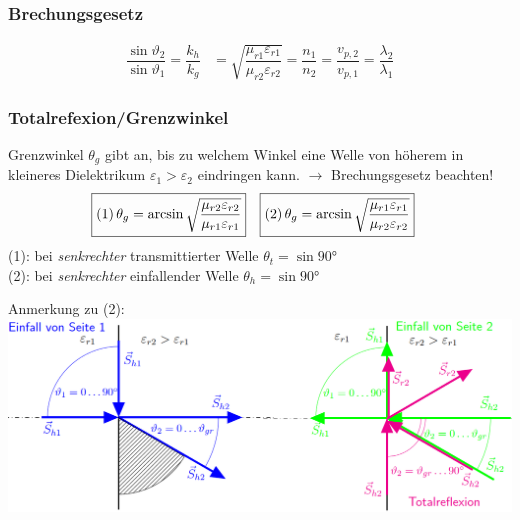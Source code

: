 \subsubsection{Brechungsgesetz}
\begin{align*}
	\dfrac{\sin \vartheta_{2}}{\sin \vartheta_{1}} = \dfrac{k_{h}}{k_{g}} & = \sqrt{\dfrac{\mu_{r 1} \varepsilon_{r 1}}{\mu_{r 2} \varepsilon_{r 2}}} = \dfrac{n_{1}}{n_{2}} = \dfrac{v_{p, 2}}{v_{p, 1}} = \dfrac{\lambda_{2}}{\lambda_{1}}
\end{align*}
\subsubsection{Totalrefexion/Grenzwinkel}
Grenzwinkel $ \theta_g $ gibt an, bis zu welchem Winkel eine Welle von höherem in kleineres Dielektrikum $ \varepsilon_1 > \varepsilon_2 $ eindringen kann. $ \rightarrow $ Brechungsgesetz beachten!
\begin{align*}
	\Aboxed{(1) \, \theta_g & = \arcsin \sqrt{\frac{\mu_{r2}\varepsilon_{r2}}{\mu_{r1}\varepsilon_{r1}}} } &
	\Aboxed{(2) \, \theta_g & = \arcsin \sqrt{ \dfrac{\mu_{r1} \varepsilon_{r1}}{\mu_{r2} \varepsilon_{r2}}}}
&
\end{align*}
(1): bei \textit{senkrechter} transmittierter Welle $ \theta_t = \sin \ang{90}$\\
(2): bei \textit{senkrechter} einfallender Welle $ \theta_h = \sin \ang{90}$

Anmerkung zu (2):\\
\includegraphics[width=\columnwidth]{Figures/Grenzwinkel_Bild.png}

